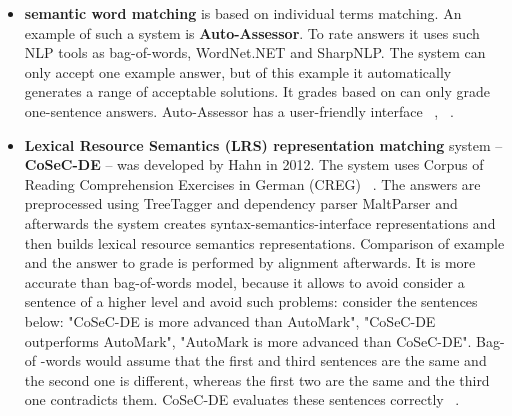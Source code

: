 \begin{itemize}
\begin{itemize}
\end{itemize}
\item \textbf{semantic word matching} is based on individual terms matching. An example of such a system is \textbf{Auto-Assessor}. To rate answers it uses such NLP tools as bag-of-words, WordNet.NET and SharpNLP. The system can only accept one example answer, but of this example it automatically generates a range of acceptable solutions. It grades based on can only grade one-sentence answers. Auto-Assessor has a user-friendly interface ~\cite{Burrows}, ~\cite{Hasanah}. 
\item \textbf{Lexical Resource Semantics (LRS) representation matching} system -- \textbf{CoSeC-DE} -- was developed by Hahn in 2012. The system uses Corpus of Reading Comprehension Exercises in German (CREG) ~\cite{CREG}. The answers are preprocessed using TreeTagger and dependency parser MaltParser and afterwards the system creates syntax-semantics-interface representations and then builds lexical resource semantics representations. Comparison of example and the answer to grade is performed by alignment afterwards. It is more accurate than bag-of-words model, because it allows to avoid consider a sentence of a higher level and avoid such problems: consider the sentences below: "CoSeC-DE is more advanced than AutoMark", "CoSeC-DE outperforms AutoMark", "AutoMark is more advanced than CoSeC-DE". Bag-of -words would assume that the first and third sentences are the same and the second one is different, whereas the first two are the same and the third one contradicts them. CoSeC-DE evaluates these sentences correctly  ~\cite{Hahn}.
\end{itemize}


